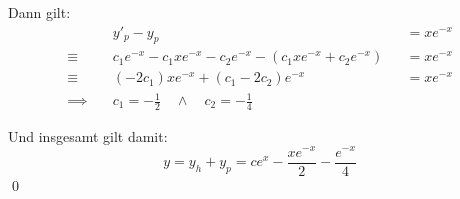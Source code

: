 \documentclass[answers]{exam}
\begin{document}
\begin{questions}
\begin{parts}
\begin{solution}
            Dann gilt:
            $$
                \begin{aligned}
                                   & y'_p - y_p                                                                 &  & = xe^{-x} \\
                    \equiv \quad   & c_1 e^{-x} - c_1 xe^{-x} - c_2e^{-x} - \left(c_1xe^{-x} + c_2e^{-x}\right) &  & = xe^{-x} \\
                    \equiv \quad   & (-2c_1)xe^{-x} + (c_1-2c_2)e^{-x}                                          &  & = xe^{-x} \\
                    \implies \quad & c_1 = -\frac{1}{2} \quad \land \quad c_2 = -\frac{1}{4}
                \end{aligned}
            $$

            Und insgesamt gilt damit:
            $$
                y = y_h + y_p = ce^x - \frac{xe^{-x}}{2} - \frac{e^{-x}}{4}
            $$\qed
        \end{solution}
    \end{parts}


\end{questions}
\end{document}
